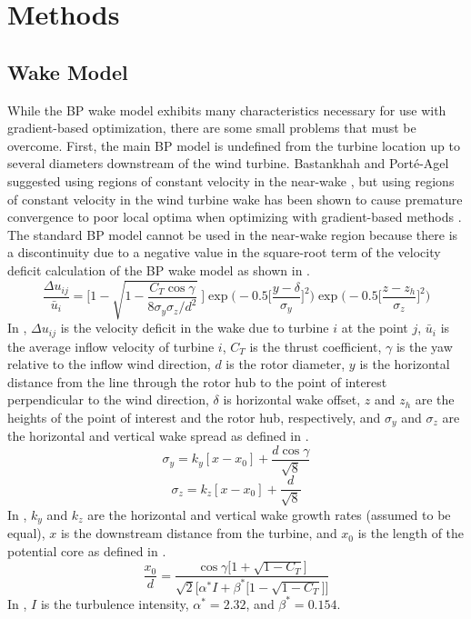 \documentclass[conf]{new-aiaa}
\begin{document}
\section{Methods}

\subsection{Wake Model}
While the BP wake model exhibits many characteristics necessary for use with gradient-based optimization, there are some small problems that must be overcome. First, the main BP model is undefined from the turbine location up to several diameters downstream of the wind turbine. Bastankhah and Port\'{e}-Agel suggested using regions of constant velocity in the near-wake \cite{bastankhah2016}, but using regions of constant velocity in the wind turbine wake has been shown to cause premature convergence to poor local optima when optimizing with gradient-based methods \cite{thomas2017}. The standard BP model cannot be used in the near-wake region because there is a discontinuity due to a negative value in the square-root term of the velocity deficit calculation of the BP wake model as shown in . 
\begin{equation}\label{eq:bp-vel}
	\frac{\Delta u_{ij}}{\bar{u}_{i}} = \Bigg[1-\sqrt{1-\frac{C_{T} \cos{\gamma}}{8 \sigma_y \sigma_z/d^2}}~\Bigg] \exp{\bigg(-0.5\bigg[\frac{y-\delta}{\sigma_y}\bigg]^2\bigg)}\exp{\bigg(-0.5\bigg[\frac{z-z_h}{\sigma_z}\bigg]^2\bigg)}
\end{equation}
%
In , $\Delta u_{ij}$ is the velocity deficit in the wake due to turbine $i$ at the point $j$, $\bar{u}_{i}$ is the average inflow velocity of turbine $i$, $C_T$ is the thrust coefficient, $\gamma$ is the yaw relative to the inflow wind direction, $d$ is the rotor diameter, $y$ is the horizontal distance from the line through the rotor hub to the point of interest perpendicular to the wind direction, $\delta$ is horizontal wake offset, $z$ and $z_h$ are the heights of the point of interest and the rotor hub, respectively, and $\sigma_y$ and $\sigma_z$ are the horizontal and vertical wake spread as defined in .
%
\begin{equation}\label{eq:sigmay}
	\sigma_y = k_y [x - x_0] + \frac{d \cos{\gamma}}{\sqrt{8}}
\end{equation}
%
%
\begin{equation}\label{eq:sigmaz}
	\sigma_z = k_z [x - x_0] + \frac{d}{\sqrt{8}}
\end{equation}
%
In , $k_y$ and $k_z$ are the horizontal and vertical wake growth rates (assumed to be equal), $x$  is the downstream distance from the turbine, and $x_0$ is the length of the potential core as defined in .
%
\begin{equation}\label{eq:potentialcore}
	\frac{x_0}{d} = \frac{\cos{\gamma }\Big[1+\sqrt{1-C_T}\Big]}{\sqrt{2} \Big[\alpha ^* I + \beta ^* \Big[1- \sqrt{1-C_T}\Big]\Big]}
\end{equation}
In , $I$ is the turbulence intensity, $\alpha^*=2.32$, and $\beta^*=0.154$. 
\end{document}
